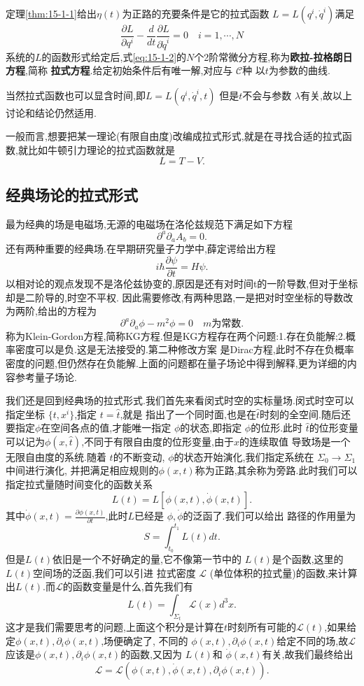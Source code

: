 \documentclass[../main.tex]{subfiles}
\begin{document}
 定理\ref{thm:15-1-1}给出$\eta(t)$为正路的充要条件是它的拉式函数 $L = L(q^i,\dot{q}^i)$满足 
 \begin{equation}
 \frac{\partial L}{ \partial q^i}  - \frac{d}{dt} \frac{\partial L}{\partial \dot{q}^i} = 0 \quad i = 1, \cdots , N
 \label{eq:15-1-2} 
 \end{equation}
 系统的$L$的函数形式给定后,式\ref{eq:15-1-2}的$N$个2阶常微分方程,称为\textbf{欧拉-拉格朗日方程},简称 \textbf{拉式方程}.给定初始条件后有唯一解,对应与 $\mathscr{C}$种
 以$t$为参数的曲线.

 当然拉式函数也可以显含时间,即$L= L(q^i,\dot{q}^i,t) $ 但是$t$不会与参数 $\lambda$有关,故以上讨论和结论仍然适用.

 一般而言,想要把某一理论(有限自由度)改编成拉式形式,就是在寻找合适的拉式函数,就比如牛顿引力理论的拉式函数就是\[
 L = T - V
 .\] 
 \subsection{经典场论的拉式形式}
 最为经典的场是电磁场,无源的电磁场在洛伦兹规范下满足如下方程\[
 \partial^a\partial_a A_b = 0
 .\] 
 还有两种重要的经典场.在早期研究量子力学中,薛定谔给出方程\[
 i\hbar \frac{\partial \psi}{\partial t} = H \psi
 .\] 
 以相对论的观点发现不是洛伦兹协变的,原因是还有对时间t的一阶导数,但对于坐标却是二阶导的,时空不平权.
 因此需要修改,有两种思路,一是把对时空坐标的导数改为两阶,给出的方程为\[
 \partial^a\partial_a \phi - m^2 \phi = 0 \quad m\text{为常数}
 .\] 
 称为Klein-Gordon方程,简称KG方程.但是KG方程存在两个问题:1.存在负能解;2.概率密度可以是负.这是无法接受的.第二种修改方案
 是Dirac方程,此时不存在负概率密度的问题,但仍然存在负能解.上面的问题都在量子场论中得到解释,更为详细的内容参考量子场论.

 我们还是回到经典场的拉式形式.我们首先来看闵式时空的实标量场.闵式时空可以指定坐标 $\{t,x^i\}$,指定 $t = \hat{t}$,就是
 指出了一个同时面,也是在$\hat{t}$时刻的全空间.随后还要指定$\phi$在空间各点的值,才能唯一指定 $\phi$的状态,即指定
$\phi$的位形.此时 $\hat{t}$的位形变量可以记为$\phi(x,\hat{t})$,不同于有限自由度的位形变量,由于$x$的连续取值
导致场是一个无限自由度的系统.随着 $t$的不断变动, $\phi$的状态开始演化,我们指定系统在 $\Sigma_0 \to \Sigma_1$中间进行演化,
并把满足相应规则的$\phi(x,t)$称为正路,其余称为旁路.此时我们可以指定拉式量随时间变化的函数关系 \[
  L(t) = L[\phi(x,t),\dot{\phi}(x,t)]
.\] 
其中$\dot{\phi}(x,t) = \frac{\partial \phi(x,t)}{\partial t}$,此时$L$已经是 $\phi,\dot{\phi}$的泛函了.我们可以给出
路径的作用量为 \[
  S = \int^{t_1}_{t_0} L(t)dt
.\] 
但是$L(t)$依旧是一个不好确定的量,它不像第一节中的 $L(t)$是个函数,这里的$L(t)$空间场的泛函,我们可以引进
拉式密度 $\mathscr{L}$ (单位体积的拉式量)的函数,来计算出$L(t)$.而$\mathscr{L}$的函数变量是什么,首先我们有\[
  L(t) = \int_{\Sigma_t} \mathscr{L}(x) d^3x
.\] 
这才是我们需要思考的问题,上面这个积分是计算在$t$时刻所有可能的$\mathscr{L}(t)$,如果给定$\phi(x,t),\partial_i\phi(x,t)$,场便确定了,
不同的 $\phi(x,t),\partial_i\phi(x,t)$给定不同的场,故$\mathscr{L}$应该是$\phi(x,t),\partial_i\phi(x,t)$的函数,又因为
$L(t)$和 $\dot{\phi}(x,t)$有关,故我们最终给出 \[
\mathscr{L} = \mathscr{L}(\phi(x,t),\dot{\phi}(x,t),\partial_i\phi(x,t))
.\] 
\end{document}
